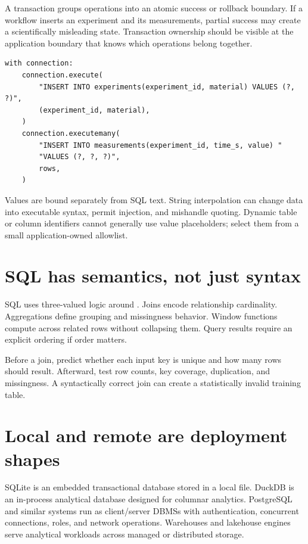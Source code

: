 A transaction groups operations into an atomic success or rollback boundary.
If a workflow inserts an experiment and its measurements, partial success may
create a scientifically misleading state. Transaction ownership should be
visible at the application boundary that knows which operations belong together.

\begin{lstlisting}
with connection:
    connection.execute(
        "INSERT INTO experiments(experiment_id, material) VALUES (?, ?)",
        (experiment_id, material),
    )
    connection.executemany(
        "INSERT INTO measurements(experiment_id, time_s, value) "
        "VALUES (?, ?, ?)",
        rows,
    )
\end{lstlisting}

Values are bound separately from SQL text. String interpolation can change data
into executable syntax, permit injection, and mishandle quoting. Dynamic table
or column identifiers cannot generally use value placeholders; select them from
a small application-owned allowlist.

\section{SQL has semantics, not just syntax}

SQL uses three-valued logic around . Joins encode relationship
cardinality. Aggregations define grouping and missingness behavior. Window
functions compute across related rows without collapsing them. Query results
require an explicit ordering if order matters.

Before a join, predict whether each input key is unique and how many rows should
result. Afterward, test row counts, key coverage, duplication, and missingness.
A syntactically correct join can create a statistically invalid training table.

\section{Local and remote are deployment shapes}

SQLite is an embedded transactional database stored in a local file. DuckDB is
an in-process analytical database designed for columnar analytics. PostgreSQL
and similar systems run as client/server DBMSs with authentication, concurrent
connections, roles, and network operations. Warehouses and lakehouse engines
serve analytical workloads across managed or distributed storage.

